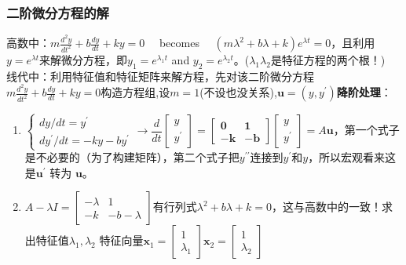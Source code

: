     \subsubsection{二阶微分方程的解}
    高数中：$m \frac{d^{2} y}{d t^{2}}+b \frac{d y}{d t}+k y=0 \quad$ becomes $\quad\left(m \lambda^{2}+b \lambda+k\right) e^{\lambda t}=0$，且利用$y=e^{\lambda t}$来解微分方程，即$y_{1}=e^{\lambda_{1} t}$ and $y_{2}=e^{\lambda_{2} t}$。($\lambda_1 \lambda_2 $是特征方程的两个根！)
    \\
    线代中：利用特征值和特征矩阵来解方程，先对该二阶微分方程$m \frac{d^{2} y}{d t^{2}}+b \frac{d y}{d t}+k y=0$构造方程组,设$m=1$(不设也没关系),$\boldsymbol{u}=\left(y, y^{\prime}\right)$\textbf{降阶处理}：
    \begin{enumerate}
        \item $\left\{\begin{array}{l}{d y / d t=y^{\prime}} \\ {d y^{\prime} / d t=-k y-b y^{\prime}}\end{array}\right. \rightarrow \dfrac{d}{d t}\left[\begin{array}{l}{y} \\ {y^{\prime}}\end{array}\right]=\left[\begin{array}{rr}{\mathbf{0}} & {\mathbf{1}} \\ {-\boldsymbol{k}} & {-\boldsymbol{b}}\end{array}\right]\left[\begin{array}{l}{y} \\ {y^{\prime}}\end{array}\right]=A \boldsymbol{u}$，第一个式子是不必要的（为了构建矩阵），第二个式子把$y^{\prime \prime}$连接到$y^{\prime}$和$y$，所以宏观看来这是$\boldsymbol{u}^{\prime}$ 转为 $\boldsymbol{u}$。
        \item $A-\lambda I=\left[\begin{array}{cc}{-\lambda} & {1} \\ {-k} & {-b-\lambda}\end{array}\right]$有行列式$\lambda^{2}+b \lambda+k=0$，这与高数中的一致！求出特征值$\lambda_1, \lambda_2$ 特征向量$\boldsymbol{x}_{1}=\left[\begin{array}{l}{1} \\ {\lambda_{1}}\end{array}\right]$\quad $\boldsymbol{x}_{2}=\left[\begin{array}{c}{1} \\ {\lambda_{2}}\end{array}\right]$

\end{enumerate}
